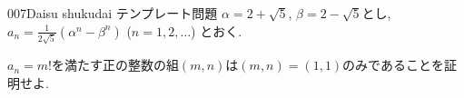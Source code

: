 \begin{prob}{007}{}{Daisu shukudai テンプレート問題}
$\alpha = 2+\sqrt{5}$, $\beta = 2-\sqrt{5}$とし, $a_n = \frac{1}{2\sqrt{5}}(\alpha^n - \beta^n)$ ($n=1,2,\dots$) とおく.

 $a_n = m!$を満たす正の整数の組$(m,n)$は$(m,n) = (1,1)$のみであることを証明せよ.
\end{prob}
